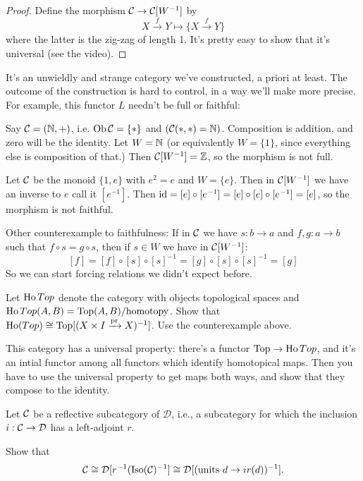\documentclass[../MH_Total.tex]{subfiles}
\begin{document}
\begin{proof}
	Define the morphism $\mathcal{C} \to \mathcal{C}[W^{-1}]$ by
	\[
	X \xrightarrow{f} Y \mapsto \{X \xrightarrow{f} Y\}
	\]
	where the latter is the zig-zag of length 1. It's pretty easy to show that it's universal (see the video). 
\end{proof}

It's an unwieldly and strange category we've constructed, a priori at least. The outcome of the construction is hard to control, in a way we'll make more precise. For example, this functor $L$ needn't be full or faithful:

Say $\mathcal{C} = (\mathbb{N},+)$, i.e. $\operatorname{Ob}\mathcal{C} = \{*\}$ and $(\mathcal{C}(*,*) = \mathbb{N})$. Composition is addition, and zero will be the identity. Let $W = \mathbb{N}$ (or equivalently $W = \{1\}$, since everything else is composition of that.) Then $\mathcal{C}[W^{-1}] = \mathbb{Z}$, so the morphism is not full.

Let $\mathcal{C}$ be the monoid $\{1,e\}$ with $e^2 = e$ and $W = \{e\}$. Then in $\mathcal{C}[W^{-1}]$ we have an inverse to $e$ call it $[e^{-1}]$. Then $\operatorname{id} = [e] \circ [e^{-1}] = [e] \circ [e] \circ [e^{-1}] = [e]$, so the morphism is not faithful.

Other counterexample to faithfulness: If in $\mathcal{C}$ we have $s: b \to a$ and $f,g: a \to b$ such that $f \circ s= g \circ s$, then if $s \in W$ we have in $\mathcal{C}[W^{-1}]$:
\[
[f] = [f] \circ [s] \circ [s]^{-1} = [g] \circ [s] \circ [s]^{-1} = [g]
\]
So we can start forcing relations we didn't expect before.

\begin{exercise}
	Let $\operatorname{Ho}Top$ denote the category with objects topological spaces and $\operatorname{Ho}Top(A,B) = \operatorname{Top}(A,B)/\text{homotopy}$. Show that $\operatorname{Ho}(Top) \cong \operatorname{Top}[(X \times I \xrightarrow{\operatorname{pr}} X)^{-1}]$. Use the counterexample above.

	This category has a universal property: there's a functor $\operatorname{Top} \to \operatorname{Ho}Top$, and it's an intial functor among all functors which identify homotopical maps. Then you have to use the universal property to get maps both ways, and show that they compose to the identity.
\end{exercise}

\begin{exercise}
	Let $\mathcal{C}$ be a reflective subcategory of $\mathcal{D}$, i.e., a subcategory for which the inclusion $i: \mathcal{C} \to \mathcal{D}$ has a left-adjoint $r$.

	Show that 
	\[
	\mathcal{C} \cong \mathcal{D}[r^{-1}(\operatorname{Iso}(\mathcal{C})^{-1}] \cong \mathcal{D}[(\text{units }d \to ir(d))^{-1}]. 
	\]
\end{exercise}
\end{document}
